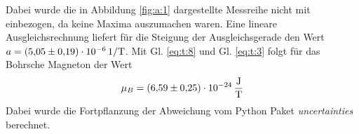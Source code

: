 Dabei wurde die in Abbildung \ref{fig:a:1} dargestellte Messreihe nicht mit einbezogen, da keine Maxima auszumachen waren.
Eine lineare Ausgleichsrechnung liefert für die Steigung der Ausgleichsgerade den Wert $a=\SI{5.05\pm 0.19e-06}{1\per\tesla}$.
Mit Gl. \eqref{eq:t:8} und Gl. \eqref{eq:t:3} folgt für das Bohrsche Magneton der Wert
\begin{align*}
\mu_B = \SI{6.59 \pm 0.25 e-24}{\joule\per\tesla}
\end{align*}
Dabei wurde die Fortpflanzung der Abweichung vom Python Paket \textit{uncertainties} berechnet.